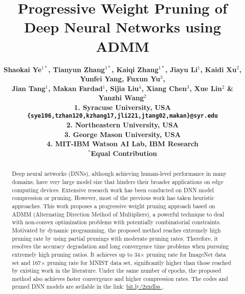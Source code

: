 \documentclass{article} %
\title{Progressive Weight Pruning of Deep Neural Networks using ADMM}
\author{\bf{Shaokai Ye$^{1*}$, Tianyun Zhang$^{1*}$,  Kaiqi Zhang$^{1*}$, Jiayu Li$^1$, Kaidi Xu$^2$, Yunfei Yang, Fuxun Yu$^3$,}\\ \bf{Jian Tang$^1$, Makan Fardad$^1$, Sijia Liu$^4$, Xiang Chen$^3$, Xue Lin$^2$ \& Yanzhi Wang$^2$}\\ 
1. Syracuse University, USA \\
\texttt{\{sye106,tzhan120,kzhang17,jli221,jtang02,makan\}@syr.edu} \\
2. Northeastern University, USA  \\ 
3. George Mason University, USA\\
4. MIT-IBM Watson AI Lab, IBM Research\\
$^*$Equal Contribution\\
}
\begin{document}
\maketitle
%
\begin{abstract}
Deep neural networks (DNNs), although achieving human-level performance in many domains, have very large model size that hinders their broader applications on edge computing devices.
Extensive research work has been conducted on DNN model compression or pruning.
However, most of the previous work has taken heuristic approaches.
This work proposes a progressive weight pruning approach based on ADMM (Alternating Direction Method of Multipliers), a powerful technique to deal with non-convex optimization problems with potentially combinatorial constraints.
Motivated by dynamic programming, the proposed method reaches extremely high pruning rate by using partial prunings with moderate pruning rates.
Therefore, it resolves the accuracy degradation and long convergence time problems when pursuing extremely high pruning ratios.
It achieves up to 34$\times$ pruning rate for ImageNet data set and 167$\times$ pruning rate for MNIST data set, significantly higher than those reached by existing work in the literature.
Under the same number of epochs, the proposed method also achieves faster convergence and higher compression rates. The codes and pruned DNN models are avilable in the link: \url{bit.ly/2zxdlss	}.
\end{abstract}






\end{document}

